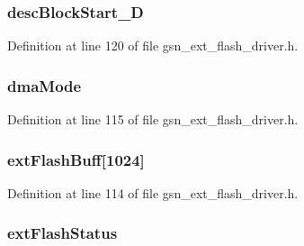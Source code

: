 \hypertarget{a00071_afe80cbb45b9a6477d7b57db13aff5814}{
\subsubsection[{descBlockStart\_\-D}]{ {\bf descBlockStart\_\-D}}}
\label{a00071_afe80cbb45b9a6477d7b57db13aff5814}


Definition at line 120 of file gsn\_\-ext\_\-flash\_\-driver.h.

\hypertarget{a00071_a8745e343cad523631d63304871d0bdf3}{
\subsubsection[{dmaMode}]{ {\bf dmaMode}}}
\label{a00071_a8745e343cad523631d63304871d0bdf3}


Definition at line 115 of file gsn\_\-ext\_\-flash\_\-driver.h.

\hypertarget{a00071_a8a0a12fc30e057410c37123d19ebaa55}{
\subsubsection[{extFlashBuff}]{ {\bf extFlashBuff}\mbox{[}1024\mbox{]}}}
\label{a00071_a8a0a12fc30e057410c37123d19ebaa55}


Definition at line 114 of file gsn\_\-ext\_\-flash\_\-driver.h.

\hypertarget{a00071_a3677ef907dd72b932f4c6fb1bbad5e7a}{
\subsubsection[{extFlashStatus}]{ {\bf extFlashStatus}}}
\label{a00071_a3677ef907dd72b932f4c6fb1bbad5e7a}



